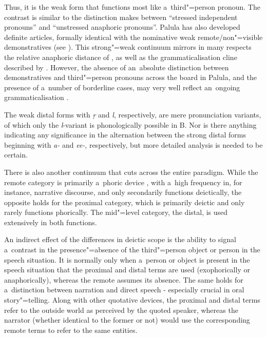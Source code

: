 Thus, it is the weak form that functions most like a~third"=person pronoun. The contrast is similar to the distinction \citet[417--419]{givon2001a} makes between ``stressed independent pronouns'' and ``unstressed anaphoric pronouns''. Palula has also developed definite articles, formally identical with the nominative weak remote/non"=visible demonstratives (see ). This strong"=weak continuum mirrors in many respects the relative anaphoric distance of \citet[419]{givon2001a}, as well as the grammaticalisation cline described by \citet[432]{diessel2006}. However, the absence of an~absolute distinction between demonstratives and third"=person pronouns across the board in Palula, and the presence of a~number of borderline cases, may very well reflect an~ongoing grammaticalisation \citep[213]{himmelmann1996}.


The weak distal forms with \textit{ṛ} and \textit{l}, respectively, are mere pronunciation variants, of which only the \textit{l}-variant is phonologically possible in B. Nor is there anything indicating any significance in the alternation between the strong distal forms beginning with \textit{a-} and \textit{ee-}, respectively, but more detailed analysis is needed to be certain.



There is also another continuum that cuts across the entire paradigm. While the remote category is primarily a~phoric device \citep[131]{saxena2006}, with a~high frequency in, for instance, narrative discourse, and only secondarily functions deictically, the opposite holds for the proximal category, which is primarily deictic and only rarely functions phorically. The mid"=level category, the distal, is used extensively in both functions. 



An indirect effect of the differences in deictic scope is the ability to signal a~contrast in the presence"=absence of the third"=person object or person in the speech situation. It is normally only when a~person or object is present in the speech situation that the proximal and distal terms are used (exophorically or anaphorically), whereas the remote assumes its absence. The same holds for a~distinction between narration and direct speech - especially crucial in oral story"=telling. Along with other quotative devices, the proximal and distal terms refer to the outside world as perceived by the quoted speaker, whereas the narrator (whether identical to the former or not) would use the corresponding remote terms to refer to the same entities.



